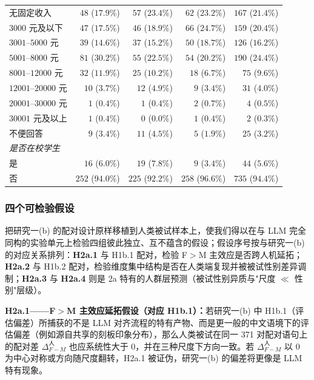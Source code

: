 \documentclass[UTF8,12pt]{ctexart}
\begin{document}
\begin{table}[!t]
{\begin{tabular}{lrrrr}
\quad 无固定收入 & $48$ ($17.9\%$) & $57$ ($23.4\%$) & $62$ ($23.2\%$) & $167$ ($21.4\%$) \\
\quad $3000$ 元及以下 & $47$ ($17.5\%$) & $46$ ($18.9\%$) & $66$ ($24.7\%$) & $159$ ($20.4\%$) \\
\quad $3001$--$5000$ 元 & $39$ ($14.6\%$) & $37$ ($15.2\%$) & $50$ ($18.7\%$) & $126$ ($16.2\%$) \\
\quad $5001$--$8000$ 元 & $81$ ($30.2\%$) & $55$ ($22.5\%$) & $54$ ($20.2\%$) & $190$ ($24.4\%$) \\
\quad $8001$--$12000$ 元 & $32$ ($11.9\%$) & $25$ ($10.2\%$) & $18$ ($6.7\%$) & $75$ ($9.6\%$) \\
\quad $12001$--$20000$ 元 & $10$ ($3.7\%$) & $12$ ($4.9\%$) & $9$ ($3.4\%$) & $31$ ($4.0\%$) \\
\quad $20001$--$30000$ 元 & $1$ ($0.4\%$) & $1$ ($0.4\%$) & $2$ ($0.7\%$) & $4$ ($0.5\%$) \\
\quad $30001$ 元及以上 & $1$ ($0.4\%$) & $0$ ($0.0\%$) & $1$ ($0.4\%$) & $2$ ($0.3\%$) \\
\quad 不便回答 & $9$ ($3.4\%$) & $11$ ($4.5\%$) & $5$ ($1.9\%$) & $25$ ($3.2\%$) \\
\midrule
\multicolumn{5}{l}{\textit{是否在校学生}} \\
\quad 是 & $16$ ($6.0\%$) & $19$ ($7.8\%$) & $9$ ($3.4\%$) & $44$ ($5.6\%$) \\
\quad 否 & $252$ ($94.0\%$) & $225$ ($92.2\%$) & $258$ ($96.6\%$) & $735$ ($94.4\%$) \\
\bottomrule
\end{tabular}%
}
\end{table}

\subsubsection{四个可检验假设}
\label{subsubsec:2a-hypotheses}

把研究一(b) 的配对设计原样移植到人类被试样本上，使我们得以在与 LLM 完全同构的实验单元上检验四组彼此独立、互不蕴含的假设；假设序号按与研究一(b) 的对应关系排列：\textbf{H2a.1} 与 H1b.1 配对，检验 F$>$M 主效应是否跨人机延拓；\textbf{H2a.2} 与 H1b.2 配对，检验维度集中结构是否在人类端复现并被被试性别差异调制；\textbf{H2a.3} 与 \textbf{H2a.4} 则是 2a 特有的人群层预测（被试性别异质与"尺度 $\ll$ 性别"层级）。

\textbf{H2a.1——F$>$M 主效应延拓假设（对应 H1b.1）：}若研究一(b) 中 H1b.1（评估偏差）所捕获的不是 LLM 对齐流程的特有产物、而是更一般的中文语境下的评估偏差（例如源自共享的刻板印象分布），那么人类被试在同一 371 对配对语句上的配对差 $\Delta_{F-M}^{\text{人}}$ 也应系统性大于 $0$，并在三种尺度下方向一致。若 $\Delta_{F-M}^{\text{人}}$ 以 $0$ 为中心对称或方向随尺度翻转，H2a.1 被证伪，研究一(b) 的偏差将更像是 LLM 特有现象。
\end{document}
